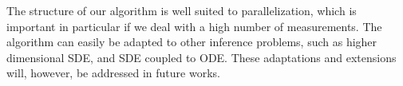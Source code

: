 \documentclass[11pt]{article}
\theoremstyle{definition}
\begin{document}

The structure of our algorithm is well suited to parallelization, which is important in particular if we deal with a high number of measurements. The algorithm can easily be adapted to other inference problems, such as higher dimensional SDE, and SDE coupled to ODE. These adaptations and extensions will, however, be addressed in future works.



%
\end{document}
